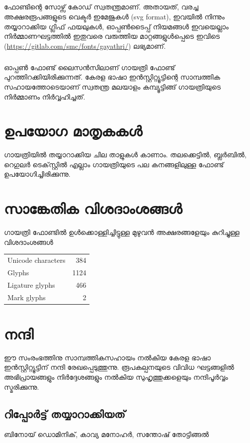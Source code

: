 \documentclass[12pt]{report}
\begin{document}
	\paragraph{}
	ഫോണ്ടിന്റെ സോഴ്സ് കോഡ് സ്വതന്ത്രമാണ്. അതായത്, വരച്ച അക്ഷരരൂപങ്ങളുടെ വെക്ടര്‍ ഇമേജുകള്‍ (svg format), ഇവയില്‍ നിന്നും തയ്യാറാക്കിയ ഗ്ലിഫ് ഫയലുകള്‍, ഓപ്പണ്‍ടൈപ്പ്  നിയമങ്ങള്‍ ഇവയെല്ലാം നിര്‍മ്മാണഘട്ടത്തില്‍ ഇതുവരെ വരുത്തിയ മാറ്റങ്ങളുള്‍പ്പെടെ ഇവിടെ (\url{https://gitlab.com/smc/fonts/gayathri/}) ലഭ്യമാണ്.
	
	\paragraph{}
		ഓപ്പണ്‍ ഫോണ്ട് ലൈസന്‍സിലാണ് ഗായത്രി ഫോണ്ട് പുറത്തിറക്കിയിരിക്കുന്നത്.  കേരള ഭാഷാ ഇൻസ്റ്റിറ്റ്യൂട്ടിന്റെ സാമ്പത്തിക സഹായത്തോടെയാണ്  സ്വതന്ത്ര മലയാളം കമ്പ്യൂട്ടിങ്ങ് ഗായത്രിയുടെ നിർമ്മാണം നിർവ്വഹിച്ചത്.
	
	\newpage
	\clearpage
	
	\chapter*{ഉപയോഗ മാതൃകകള്‍‍}
	
	ഗായത്രിയിൽ തയ്യാറാക്കിയ ചില താളുകൾ കാണാം. തലക്കെട്ടിൽ, ബ്ലർബിൽ, റെഗുലർ ടെക്‌സ്റ്റിൽ എല്ലാം ഗായത്രിയുടെ പല കനങ്ങളിലുള്ള  ഫോണ്ട് ഉപയോഗിച്ചിരിക്കുന്നു.

	
	
	
	\chapter*{സാങ്കേതിക വിശദാംശങ്ങള്‍}
	
	ഗായത്രി ഫോണ്ടില്‍ ഉള്‍ക്കൊള്ളിച്ചിട്ടുള്ള മുഴുവന്‍ അക്ഷരങ്ങളേയും കുറിച്ചുള്ള വിശദാംശങ്ങൾ 
	\\[1cm]

    \begin{tabular}[l]{|l|r|}
    \hline
  Unicode characters & 384 \\
Glyphs & 1124 \\
Ligature glyphs & 466 \\
Mark glyphs & 2 \\\hline
\end{tabular}

	
	
	\chapter*{നന്ദി}
	ഈ സംരംഭത്തിനു സാമ്പത്തികസഹായം നൽകിയ കേരള ഭാഷാ ഇൻസ്റ്റിറ്റ്യൂട്ടിന് നന്ദി രേഖപ്പെടുത്തുന്നു.
	രൂപകല്പനയുടെ വിവിധ ഘട്ടങ്ങളിൽ അഭിപ്രായങ്ങളും നിർദ്ദേശങ്ങളും നൽകിയ സുഹൃത്തുക്കളെയും നന്ദിപൂർവ്വം സ്മരിക്കുന്നു.
	
	\section*{റിപ്പോർട്ട് തയ്യാറാക്കിയത്}
	ബിനോയ് ഡൊമിനിക്, കാവ്യ മനോഹർ, സന്തോഷ് തോട്ടിങ്ങൽ
\end{document}
